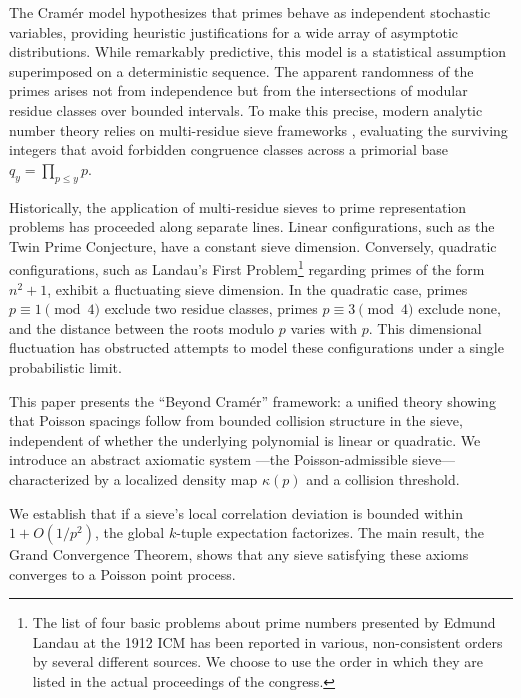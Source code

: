 \documentclass{amsart}
\theoremstyle{definition}
\theoremstyle{remark}
\numberwithin{equation}{section}
\begin{document}
The Cram\'er model \cite{cramer1936} hypothesizes that primes behave as independent stochastic
variables, providing heuristic justifications for a wide array of asymptotic distributions. While
remarkably predictive, this model is a statistical assumption superimposed on a deterministic
sequence. The apparent randomness of the primes arises not from independence but from the
intersections of modular residue classes over bounded intervals. To make this precise, modern
analytic number theory relies on multi-residue sieve frameworks \cite{friedlander2010}, evaluating
the surviving integers that avoid forbidden congruence classes across a primorial base
$q_y = \prod_{p \le y} p$.

Historically, the application of multi-residue sieves to prime representation problems has
proceeded along separate lines. Linear configurations, such as the Twin Prime Conjecture, have a
constant sieve dimension. Conversely, quadratic configurations, such as Landau's First
Problem\footnote{The list of four basic problems about prime numbers presented by Edmund Landau
at the 1912 ICM \cite{landau1912} has been reported in various, non-consistent orders by several
different sources. We choose to use the order in which they are listed in the actual proceedings
of the congress.} regarding primes of the form $n^2+1$, exhibit a fluctuating sieve dimension.
In the quadratic case, primes $p \equiv 1 \pmod 4$ exclude two residue classes, primes
$p \equiv 3 \pmod 4$ exclude none, and the distance between the roots modulo $p$ varies with $p$.
This dimensional fluctuation has obstructed attempts to model these configurations under a
single probabilistic limit.

This paper presents the ``Beyond Cram\'er'' framework: a unified theory showing that Poisson
spacings follow from bounded collision structure in the sieve, independent of whether the
underlying polynomial is linear or quadratic. We introduce an abstract axiomatic system
---the Poisson-admissible sieve---characterized by a localized density map $\kappa(p)$ and a
collision threshold.

We establish that if a sieve's local correlation deviation is bounded within $1 + O(1/p^2)$,
the global $k$-tuple expectation factorizes. The main result, the Grand Convergence Theorem,
shows that any sieve satisfying these axioms converges to a Poisson point process.
\end{document}
